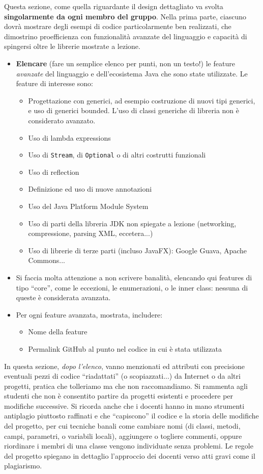 \documentclass[a4paper,12pt]{report}
\begin{document}
Questa sezione, come quella riguardante il design dettagliato va svolta \textbf{singolarmente da ogni membro del gruppo}.
%
Nella prima parte, ciascuno dovrà mostrare degli esempi di codice particolarmente ben realizzati,
che dimostrino proefficienza con funzionalità avanzate del linguaggio e capacità di spingersi oltre le librerie mostrate a lezione.

\begin{itemize}
	\item \textbf{Elencare} (fare un semplice elenco per punti, non un testo!) le feature \textit{avanzate} del linguaggio e dell'ecosistema Java che sono state
utilizzate. Le feature di interesse sono:
	\begin{itemize}
		\item Progettazione con generici, ad esempio costruzione di nuovi tipi generici, e uso di generici bounded.
		L'uso di classi generiche di libreria non è considerato avanzato.
		\item Uso di lambda expressions
		\item Uso di \texttt{Stream}, di \texttt{Optional} o di altri costrutti funzionali
		\item Uso di reflection
		\item Definizione ed uso di nuove annotazioni
		\item Uso del Java Platform Module System
		\item Uso di parti della libreria JDK non spiegate a lezione (networking, compressione, parsing XML, eccetera...)
		\item Uso di librerie di terze parti (incluso JavaFX): Google Guava, Apache Commons...
	\end{itemize}
	\item Si faccia molta attenzione a non scrivere banalità, elencando qui features di tipo ``core'', come le eccezioni, le enumerazioni, o le inner class: nessuna di queste è considerata avanzata.
	\item Per ogni feature avanzata, mostrata, includere:
	\begin{itemize}
		\item Nome della feature
		\item Permalink GitHub al punto nel codice in cui è stata utilizzata
	\end{itemize}
\end{itemize}

In questa sezione, \textit{dopo l'elenco},
vanno menzionati ed attributi con precisione eventuali pezzi di codice ``riadattati'' (o scopiazzati...) da Internet o da altri progetti,
pratica che tolleriamo ma che non raccomandiamo.
%
Si rammenta agli studenti che non è consentito partire da progetti esistenti e procedere per modifiche successive.
%
Si ricorda anche che i docenti hanno in mano strumenti antiplagio piuttosto raffinati e che ``capiscono'' il codice e la storia delle modifiche del progetto,
per cui tecniche banali come cambiare nomi (di classi, metodi, campi, parametri, o variabili locali),
aggiungere o togliere commenti,
oppure riordinare i membri di una classe vengono individuate senza problemi.
%
Le regole del progetto spiegano in dettaglio l'approccio dei docenti verso atti gravi come il plagiarismo.
\end{document}

